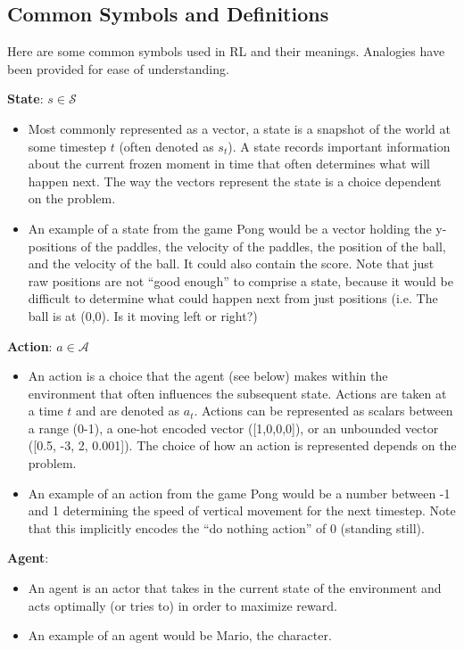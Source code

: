 \subsection{Common Symbols and Definitions}
\begin{flushleft}
    \large Here are some common symbols used in RL and their meanings. Analogies have been provided for ease of understanding.\break

    \textbf{State}: $s \in \mathcal{S}$
    \begin{itemize}
        \item Most commonly represented as a vector, a state is a snapshot of the world at some timestep $t$ (often denoted as $s_t$). A state records important information about the current frozen moment in time that often determines what will happen next. The way the vectors represent the state is a choice dependent on the problem.
        \item An example of a state from the game Pong would be a vector holding the y-positions of the paddles, the velocity of the paddles, the position of the ball, and the velocity of the ball. It could also contain the score. Note that just raw positions are not ``good enough'' to comprise a state, because it would be difficult to determine what could happen next from just positions (i.e. The ball is at (0,0). Is it moving left or right?)
    \end{itemize}

    \textbf{Action}: $a \in \mathcal{A}$
    \begin{itemize}
        \item An action is a choice that the agent (see below) makes within the environment that often influences the subsequent state. Actions are taken at a time $t$ and are denoted as $a_t$. Actions can be represented as scalars between a range (0-1), a one-hot encoded vector ([1,0,0,0]), or an unbounded vector ([0.5, -3, 2, 0.001]). The choice of how an action is represented depends on the problem.
        \item An example of an action from the game Pong would be a number between -1 and 1 determining the speed of vertical movement for the next timestep. Note that this implicitly encodes the ``do nothing action'' of 0 (standing still).
    \end{itemize}

    \textbf{Agent}:
    \begin{itemize}
        \item An agent is an actor that takes in the current state of the environment and acts optimally (or tries to) in order to maximize reward. 
        \item An example of an agent would be Mario, the character.
    \end{itemize}


\end{flushleft}
